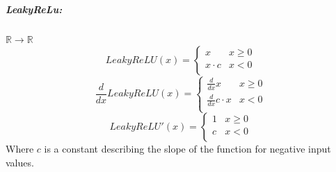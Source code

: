 \documentclass[12pt]{article}
\begin{document}
\subparagraph{LeakyReLu:}\(\mathbb{R} \to \mathbb{R}\)
\begin{equation} \label{eq:NN:ReLU}
LeakyReLU(x) = \left\{
\begin{array}{ll}
x & x \ge 0 \\
x \cdot c & x < 0 \\
\end{array}
\right.
\end{equation}
\[
\frac{d}{dx} LeakyReLU(x) = \left\{
\begin{array}{ll}
\frac{d}{dx}x & x \ge 0 \\
\frac{d}{dx}c\cdot x & x < 0 \\
\end{array}
\right.
\]
\begin{equation} \label{eq:NN:Relu_derivative}
LeakyReLU'(x) = \left\{
\begin{array}{ll}
1 & x \ge 0 \\
c & x < 0 \\
\end{array}
\right.
\end{equation}
Where \(c\) is a constant describing the slope of the function for negative input values.
\end{document}
